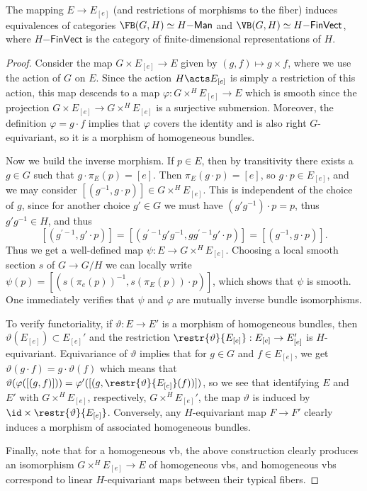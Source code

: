 \begin{thm}\label{prop 1.4.3 Cap}
    The mapping $E\to E_{[e]}$ (and restrictions of morphisms to the fiber) induces equivalences of categories $\FB(G,H)\simeq H\mathsf{-Man}$ and $\VB(G,H)\simeq H\mathsf{-FinVect}$, where $H\mathsf{-FinVect}$ is the category of finite-dimensional representations of $H$.
\end{thm}
\begin{proof}
    Consider the map $G\times E_{[e]}\to E$ given by $(g,f)\mapsto g\times f$, where we use the action of $G$ on $E$. Since the action $H\acts E_{[e]}$ is simply a restriction of this action, this map descends to a map $\varphi:G\times^H E_{[e]}\to E$ which is smooth since the projection $G\times E_{[e]}\to G\times^H E_{[e]}$ is a surjective submersion. Moreover, the definition $\varphi=g\cdot f$ implies that $\varphi$ covers the identity and is also right $G$-equivariant, so it is a morphism of homogeneous bundles.

    Now we build the inverse morphism. If $p\in E$, then by transitivity there exists a $g\in G$ such that $g\cdot \pi_E(p)=[e]$. Then $\pi_E(g\cdot p)=[e]$, so $g\cdot p\in E_{[e]}$, and we may consider $[(g^{-1},g\cdot p)]\in G\times^H E_{[e]}$. This is independent of the choice of $g$, since for another choice $g'\in G$ we must have $(g'g^{-1})\cdot p=p$, thus $g'g^{-1}\in H$, and thus
    \[[(g^{\prime-1},g'\cdot p)]=[(g^{\prime-1}g'g^{-1},gg^{\prime-1}g'\cdot p)]=[(g^{-1},g\cdot p)].\]
    Thus we get a well-defined map $\psi:E\to G\times^H E_{[e]}$. Choosing a local smooth section $s$ of $G\to G\slash H$ we can locally write $\psi(p)=[(s(\pi_e(p))^{-1},s(\pi_E(p))\cdot p)]$, which shows that $\psi$ is smooth. One immediately verifies that $\psi$ and $\varphi$ are mutually inverse bundle isomorphisms.

    To verify functoriality, if $\vartheta:E\to E'$ is a morphism of homogeneous bundles, then $\vartheta(E_{[e]})\subset E_{[e]}'$ and the restriction $\restr{\vartheta}{E_{[e]}}:E_{[e]}\to E_{[e]}'$ is $H$-equivariant. Equivariance of $\vartheta$ implies that for $g\in G$ and $f\in E_{[e]}$, we get $\vartheta(g\cdot f)=g\cdot \vartheta(f)$ which means that $\vartheta(\varphi([(g,f)]))=\varphi'([(g,\restr{\vartheta}{E_{[e]}}(f))])$, so we see that identifying $E$ and $E'$ with $G\times^H E_{[e]}$, respectively, $G\times^H E_{[e]}'$, the map $\vartheta$ is induced by $\id\times \restr{\vartheta}{E_{[e]}}$. Conversely, any $H$-equivariant map $F\to F'$ clearly induces a morphism of associated homogeneous bundles.

    Finally, note that for a homogeneous \gls{vb}, the above construction clearly produces an isomorphism $G\times^H E_{[e]}\to E$ of homogeneous \glspl{vb}, and homogeneous \glspl{vb} correspond to linear $H$-equivariant maps between their typical fibers.
\end{proof}

